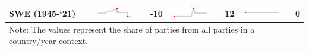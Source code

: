 \begin{table}[H]
\begin{tabular}[t]{l>{}lr>{}lr>{}lr}
SWE (1945-`21) & \includegraphics[width=0.67in, height=0.17in]{./figures/spec_plot/plot_16b6768878f14.pdf} & -10 & \includegraphics[width=0.67in, height=0.17in]{./figures/spec_plot/plot_16b675d874f6b.pdf} & 12 & \includegraphics[width=0.67in, height=0.17in]{./figures/spec_plot/plot_16b671d034680.pdf} & 0\\
\bottomrule
\multicolumn{7}{l}{\rule{0pt}{1em}Note: The values represent the share of parties from all parties in a country/year context.}\\
\end{tabular}
\end{table}
